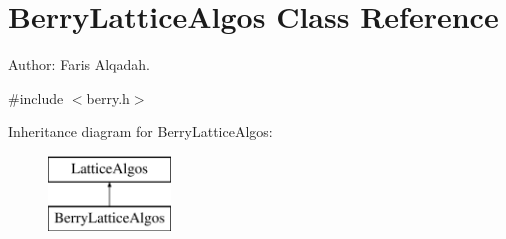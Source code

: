 \hypertarget{class_berry_lattice_algos}{
\section{BerryLatticeAlgos Class Reference}
\label{class_berry_lattice_algos}
}


Author: Faris Alqadah.  




{\ttfamily \#include $<$berry.h$>$}

Inheritance diagram for BerryLatticeAlgos:\begin{figure}[H]
\begin{center}
\leavevmode
\includegraphics[height=2.000000cm]{class_berry_lattice_algos}
\end{center}
\end{figure}
